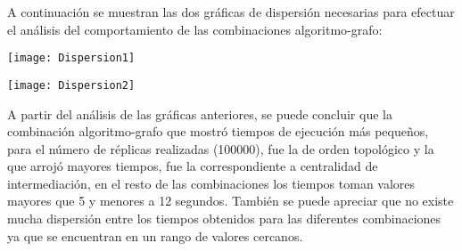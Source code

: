\documentclass[10pt,a4paper]{article}
\begin{document}
A continuación se muestran las dos gráficas de dispersión necesarias para efectuar el análisis del comportamiento de las combinaciones algoritmo-grafo:

\begin{center}

\texttt{[image: Dispersion1]}

\end{center}

\begin{center}

\texttt{[image: Dispersion2]}

\end{center}

A partir del análisis de las gráficas anteriores, se puede concluir que la combinación algoritmo-grafo que mostró tiempos de ejecución más pequeños, para el número de réplicas realizadas (100000), fue la de orden topológico y la que arrojó mayores tiempos, fue la correspondiente a centralidad de intermediación, en el resto de las combinaciones los tiempos toman valores mayores que 5 y menores a 12 segundos. También se puede apreciar que no existe mucha dispersión entre los tiempos obtenidos para las diferentes combinaciones ya que se encuentran en un rango de valores cercanos.\newpage 




\end{document}
